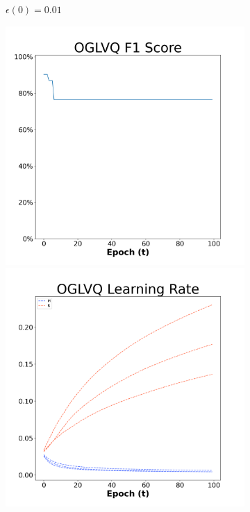 \begin{figure}[H]
\begin{subfigure}{0.3\textwidth}
  \caption{$\epsilon(0)=0.01$}
\end{subfigure}\hfil %
\begin{subfigure}{0.3\textwidth}
  \includegraphics[width=\linewidth]{images/exper2/Sonar/OGLVQ_0.03_f1.png}
  \includegraphics[width=\linewidth]{images/exper2/Sonar/OGLVQ_0.03_lr.png}

\end{subfigure}
\end{figure}
